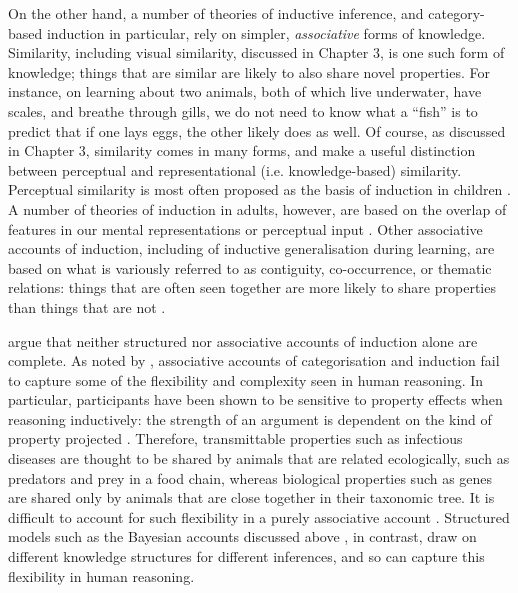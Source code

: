 On the other hand,
a number of theories of inductive inference,
and category-based induction in particular,
rely on simpler, \emph{associative} forms of knowledge.
Similarity, including visual similarity,
discussed in Chapter 3, is one such form of knowledge;
things that are similar
\citep[share many properties, or features, that we know of; see][]{Medin1993}
are likely to also share novel properties.
For instance, on learning about two animals, both of which
live underwater, have scales, and breathe through gills,
we do not need to know what a ``fish'' is
to predict that if one lays eggs, the other likely does as well.
Of course, as discussed in Chapter 3, similarity comes in many forms,
and \citet{Fisher2015} make a useful distinction between
perceptual and representational (i.e. knowledge-based) similarity.
Perceptual similarity is most often proposed
as the basis of induction in children
\citep[][see also Chapter 3]{Sloutsky2010,Sloutsky2008,Sloutsky2007}.
A number of theories of induction in adults,
however, are based on the overlap of features
in our mental representations \citep{Rogers2004,Rogers2008,Sloman1993}
or perceptual input \citep{Sloutsky2008,Sloutsky2004}.
Other associative accounts of induction,
including of inductive generalisation during learning, are based on
what is variously referred to as contiguity, co-occurrence, or thematic relations:
things that are often seen together are more likely 
to share properties than things that are not
\citep{Kruschke1992,Rumelhart1986,Rescorla1972}.


\citet{Bright2014a} argue that neither
structured nor associative accounts of induction alone are complete.
As noted by \citet{Murphy1985},
associative accounts of categorisation and induction
fail to capture some of the flexibility and complexity seen in human reasoning.
In particular, participants have been shown to be
sensitive to property effects when reasoning inductively:
the strength of an argument is dependent
on the kind of property projected
\citep{Heit1994,Shafto2007,Shafto2005}.
Therefore, transmittable properties such as infectious diseases
are thought to be shared by animals that are related ecologically,
such as predators and prey in a food chain,
whereas biological properties such as genes are shared 
only by animals that are close together in their taxonomic tree.
It is difficult to account for such flexibility in a purely associative account
\citep[but see work by][]{Sloutsky2008,Rogers2004}.
Structured models such as the Bayesian accounts discussed above \citep[i.e.][]{Kemp2009},
in contrast, draw on different knowledge structures for different inferences,
and so can capture this flexibility in human reasoning.

